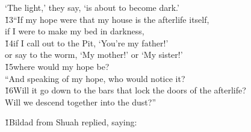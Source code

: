 \begin{poetry}
\poemll    `The light,' they say, `is about to become dark.' \\
\poeml \v{13}``If my hope were that my house is the afterlife itself, \\
\poemll    if I were to make my bed in darkness, \\
\poeml \v{14}if I call out to the Pit, `You're my father!' \\
\poemll    or say to the worm, `My mother!' or `My sister!' \\
\poeml \v{15}where would my hope be? \\
\poeml ``And speaking of my hope, who would notice it? \\
\poeml \v{16}Will it go down to the bars that lock the doors of the afterlife? \\
\poemlll       Will we descend together into the dust?''
\end{poetry}

\v{1}Bildad from Shuah replied, saying:

